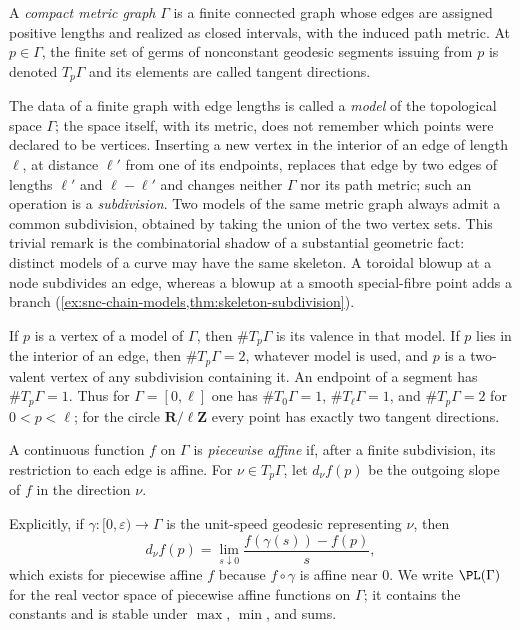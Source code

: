 \begin{definition}
\label{def:ch08-compact-metric-graph}
A \emph{compact metric graph} $\Gamma$ is a finite connected graph whose
edges are assigned positive lengths and realized as closed intervals, with
the induced path metric.  At $p\in\Gamma$, the finite set of germs of
nonconstant geodesic segments issuing from $p$ is denoted $T_p\Gamma$ and its
elements are called tangent directions.
\end{definition}

The data of a finite graph with edge lengths is called a \emph{model} of the
topological space $\Gamma$; the space itself, with its metric, does not
remember which points were declared to be vertices.  Inserting a new vertex
in the interior of an edge of length $\ell$, at distance $\ell'$ from one of
its endpoints, replaces that edge by two edges of lengths $\ell'$ and
$\ell-\ell'$ and changes neither $\Gamma$ nor its path metric; such an
operation is a \emph{subdivision}.  Two models of the same metric graph
always admit a common subdivision, obtained by taking the union of the two
vertex sets.  This trivial remark is the combinatorial shadow of a
substantial geometric fact: distinct models of a curve may have the same
skeleton.  A toroidal blowup at a node subdivides an edge, whereas a blowup
at a smooth special-fibre point adds a branch
(\cref{ex:snc-chain-models,thm:skeleton-subdivision}).

\begin{example}
\label{ex:ch08-valence}
If $p$ is a vertex of a model of $\Gamma$, then $\#T_p\Gamma$ is its valence
in that model.  If $p$ lies in the interior of an edge, then
$\#T_p\Gamma=2$, whatever model is used, and $p$ is a two-valent vertex of
any subdivision containing it.  An endpoint of a segment has
$\#T_p\Gamma=1$.  Thus for $\Gamma=[0,\ell]$ one has $\#T_0\Gamma=1$,
$\#T_\ell\Gamma=1$, and $\#T_p\Gamma=2$ for $0<p<\ell$; for the circle
$\mathbf R/\ell\mathbf Z$ every point has exactly two tangent directions.
\end{example}

A continuous function $f$ on $\Gamma$ is \emph{piecewise affine} if, after a
finite subdivision, its restriction to each edge is affine.  For
$\nu\in T_p\Gamma$, let $d_\nu f(p)$ be the outgoing slope of $f$ in the
direction $\nu$.

Explicitly, if $\gamma:[0,\varepsilon)\to\Gamma$ is the unit-speed geodesic
representing $\nu$, then
\begin{equation}
\label{eq:ch08-outgoing-slope}
 d_\nu f(p)=\lim_{s\downarrow0}\frac{f(\gamma(s))-f(p)}{s},
\end{equation}
which exists for piecewise affine $f$ because $f\circ\gamma$ is affine near
$0$.  We write $\PL(\Gamma)$ for the real vector space of piecewise affine
functions on $\Gamma$; it contains the constants and is stable under
$\max$, $\min$, and sums.

